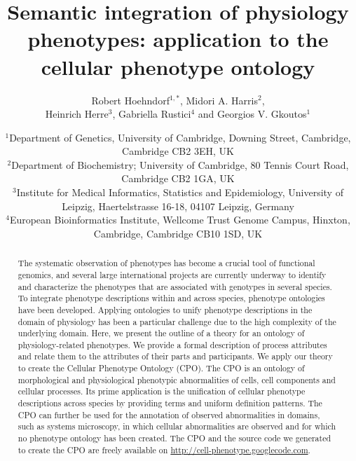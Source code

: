 \documentclass[11pt]{article}
\begin{document}
\title{Semantic integration of physiology
  phenotypes: application to the cellular phenotype ontology}

\author{Robert Hoehndorf$^{1,*}$, Midori
  A. Harris$^2$,\\Heinrich Herre$^3$, Gabriella Rustici$^4$ and
  Georgios V. Gkoutos$^{1}$}

\date{$^{1}$Department of Genetics, University of Cambridge,
  Downing Street, Cambridge, Cambridge CB2 3EH, UK\\
  $^{2}$Department of Biochemistry; University of Cambridge, 80 Tennis
  Court Road, Cambridge CB2 1GA, UK\\
  $^{3}$Institute for Medical Informatics, Statistics and
  Epidemiology, University of Leipzig, Haertelstrasse 16-18, 04107
  Leipzig, Germany\\
  $^{4}$European Bioinformatics Institute, Wellcome Trust Genome
  Campus, Hinxton, Cambridge, Cambridge CB10 1SD, UK}



\maketitle
 
\begin{abstract}
The systematic observation of phenotypes has become a crucial tool of
functional genomics, and several large international projects are
currently underway to identify and characterize the phenotypes that
are associated with genotypes in several species. To integrate
phenotype descriptions within and across species, phenotype ontologies
have been developed. Applying ontologies to unify phenotype
descriptions in the domain of physiology has been a particular
challenge due to the high complexity of the underlying domain.
Here, we present the outline of a theory for an ontology of
physiology-related phenotypes. We provide a formal description of
process attributes and relate them to the attributes of their parts
and participants. We apply our theory to create the Cellular Phenotype
Ontology (CPO). The CPO is an ontology of morphological and
physiological phenotypic abnormalities of cells, cell components and
cellular processes. Its prime application is the unification of
cellular phenotype descriptions across species by providing terms and
uniform definition patterns. The CPO can further be used for the
annotation of observed abnormalities in domains, such as systems
microscopy, in which cellular abnormalities are observed and for which
no phenotype ontology has been created.  
The CPO and the source code we generated to create the CPO are freely
available on \url{http://cell-phenotype.googlecode.com}.
\end{abstract}
\end{document}
